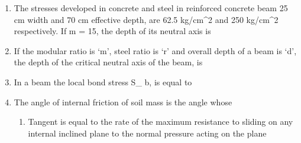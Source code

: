 \documentclass[11pt,a4paper]{article}
\begin{document}
\begin{enumerate}
\item{The stresses developed in concrete and steel in reinforced concrete beam 25 cm width and 70 cm effective depth, are 62.5 kg/cm\^{}2 and 250 kg/cm\^{}2 respectively. If m = 15, the depth of its neutral axis is
}
\\\begin{enumerate*}[itemjoin=\qquad, label=\Alph*.]
\item{20 cm}
\item{25 cm}
\item{30 cm}
\item{35 cm}
\end{enumerate*}
\item{If the modular ratio is `m', steel ratio is `r' and overall depth of a beam is `d', the depth of the critical neutral axis of the beam, is
}
\\
\item{In a beam the local bond stress S\_ b, is equal to}
\\
\item{The angle of internal friction of soil mass is the angle whose}
\begin{enumerate}[label=\Alph*.]
\item{Tangent is equal to the rate of the maximum resistance to sliding on any internal inclined plane to the normal pressure acting on the plane}

\end{enumerate}
\end{enumerate}
\end{document}
